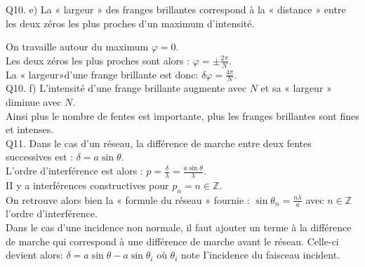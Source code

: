 \documentclass[10pt]{article}
\begin{document}
Q10. e) La « largeur » des franges brillantes correspond à la « distance » entre les deux zéros les plus proches d'un maximum d'intensité.

On travaille autour du maximum \(\varphi=0\).\\
Les deux zéros les plus proches sont alors : \(\varphi= \pm \frac{2 \pi}{N}\).\\
La « largeur»d'une frange brillante est donc: \(\delta \varphi=\frac{4 \pi}{N}\).\\
Q10. f) L'intensité d'une frange brillante augmente avec \(N\) et sa « largeur » diminue avec \(N\).\\
Ainsi plus le nombre de fentes est importante, plus les franges brillantes sont fines et intenses.\\
Q11. Dans le cas d'un réseau, la différence de marche entre deux fentes successives est : \(\delta=a \sin \theta\).\\
L'ordre d'interférence est alors : \(p=\frac{\delta}{\lambda}=\frac{a \sin \theta}{\lambda}\).\\
II y a interférences constructives pour \(p_{n}=n \in \mathbb{Z}\).\\
On retrouve alors bien la « formule du réseau » fournie : \(\sin \theta_{n}=\frac{n \lambda}{a}\) avec \(n \in \mathbb{Z}\) l'ordre d'interférence.\\
Dans le cas d'une incidence non normale, il faut ajouter un terme à la différence de marche qui correspond à une différence de marche avant le réseau. Celle-ci devient alors: \(\delta=a \sin \theta-a \sin \theta_{i}\) où \(\theta_{i}\) note I'incidence du faisceau incident.
\end{document}
